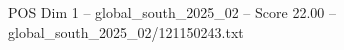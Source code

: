 \begin{textsample}{POS Dim 1 – global\_south\_2025\_02 – Score 22.00 – global\_south\_2025\_02/121150243.txt}
\end{textsample}
